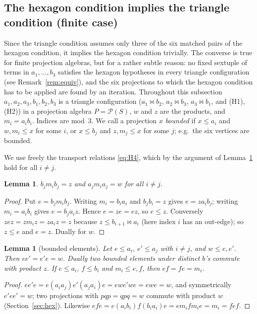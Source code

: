 \documentclass[11pt]{amsart}
\newtheorem{lemma}[theorem]{Lemma}
\theoremstyle{definition}
\renewcommand{\P}{\mathcal{P}}
\begin{document}
\subsection{The hexagon condition implies the triangle condition (finite case)}\label{subsec:equiv}

Since the triangle condition assumes only three of the six matched pairs of the hexagon condition, it implies the hexagon condition trivially. The converse is true for finite projection algebras, but for a rather subtle reason: no fixed sextuple of terms in $a_1,\dots,b_3$ satisfies the hexagon hypotheses in every triangle configuration (see Remark~\ref{rem:equiv}), and the six projections to which the hexagon condition has to be applied are found by an iteration. Throughout this subsection $a_1,a_2,a_3,b_1,b_2,b_3$ is a triangle configuration ($a_1\bowtie b_2$, $a_2\bowtie b_3$, $a_3\bowtie b_1$, and (H1), (H2)) in a projection algebra $P=\P(S)$, $w$ and $z$ are the products, and $m_i=a_ib_i$. Indices are mod~$3$. We call a projection $x$ \emph{bounded} if $x\le a_i$ and $w,m_i\le x$ for some $i$, or $x\le b_j$ and $z,m_j\le x$ for some $j$; e.g.\ the six vertices are bounded.

We use freely the transport relations \eqref{eq:H4}, which by the argument of Lemma~\ref{lem:rev} hold for all $i\ne j$.

\begin{lemma}\label{lem:rev}
$b_jm_ib_j=z$ and $a_jm_ia_j=w$ for all $i\ne j$.
\end{lemma}
\begin{proof}
Put $e=b_jm_ib_j$. Writing $m_i=b_ia_i$ and $b_jb_i=z$ gives $e=za_ib_j$; writing $m_i=a_ib_i$ gives $e=b_ja_iz$. Hence $e=ze=ez$, so $e\le z$. Conversely $zez=zm_iz=za_iz=z$ because $z\le b_{i+1}\bowtie a_i$ (here index $i$ has an out-edge); so $z\le e$ and $e=z$. Dually for $w$.
\end{proof}

\begin{lemma}[bounded elements]\label{lem:bounded}
Let $e\le a_i$, $e'\le a_j$ with $i\ne j$, and $w\le e,e'$. Then $ee'=e'e=w$. Dually two bounded elements under distinct $b$'s commute with product $z$. If $e\le a_i$, $f\le b_i$ and $m_i\le e,f$, then $ef=fe=m_i$.
\end{lemma}
\begin{proof}
$ee'e=e(a_ia_j)e'(a_ja_i)e=ewe'we=ewe=w$, and symmetrically $e'ee'=w$; two projections with $pqp=qpq=w$ commute with product $w$ (Section~\ref{sec:hex}). Likewise $efe=e(a_ib_i)f(b_ia_i)e=em_ifm_ie=m_i=fef$.
\end{proof}
\end{document}
